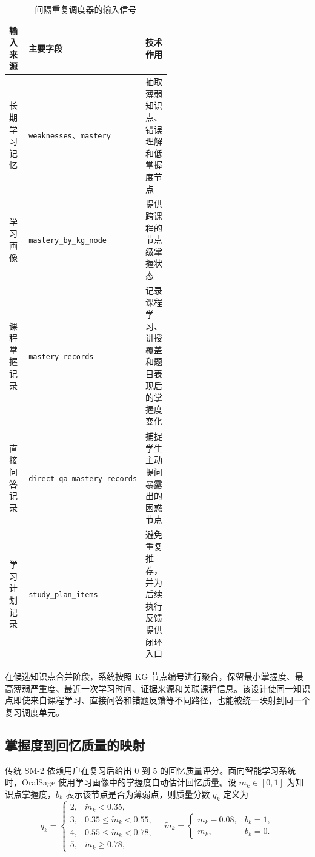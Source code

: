 \begin{table}[H]
  \centering
  \caption{间隔重复调度器的输入信号}
  \label{tab:spaced-review-inputs}
  \begin{tabularx}{\linewidth}{p{0.26\linewidth}p{0.27\linewidth}X}
    \toprule
    输入来源 & 主要字段 & 技术作用 \\
    \midrule
    长期学习记忆 & \texttt{weaknesses}、\texttt{mastery} & 抽取薄弱知识点、错误理解和低掌握度节点 \\
    学习画像 & \texttt{mastery\_by\_kg\_node} & 提供跨课程的节点级掌握状态 \\
    课程掌握记录 & \texttt{mastery\_records} & 记录课程学习、讲授覆盖和题目表现后的掌握度变化 \\
    直接问答记录 & \texttt{direct\_qa\_mastery\_records} & 捕捉学生主动提问暴露出的困惑节点 \\
    学习计划记录 & \texttt{study\_plan\_items} & 避免重复推荐，并为后续执行反馈提供闭环入口 \\
    \bottomrule
  \end{tabularx}
\end{table}

在候选知识点合并阶段，系统按照 KG 节点编号进行聚合，保留最小掌握度、最高薄弱严重度、最近一次学习时间、证据来源和关联课程信息。该设计使同一知识点即使来自课程学习、直接问答和错题反馈等不同路径，也能被统一映射到同一个复习调度单元。

\subsection{掌握度到回忆质量的映射}

传统 SM-2 依赖用户在复习后给出 $0$ 到 $5$ 的回忆质量评分。面向智能学习系统时，OralSage 使用学习画像中的掌握度自动估计回忆质量。设 $m_k\in[0,1]$ 为知识点掌握度，$b_k$ 表示该节点是否为薄弱点，则质量分数 $q_k$ 定义为
\begin{equation}
  q_k =
  \begin{cases}
  2, & \tilde m_k < 0.35,\\
  3, & 0.35 \le \tilde m_k < 0.55,\\
  4, & 0.55 \le \tilde m_k < 0.78,\\
  5, & \tilde m_k \ge 0.78,
  \end{cases}
  \quad
  \tilde m_k =
  \begin{cases}
  m_k-0.08, & b_k=1,\\
  m_k, & b_k=0.
  \end{cases}
  \label{eq:sm2-quality-mapping}
\end{equation}

